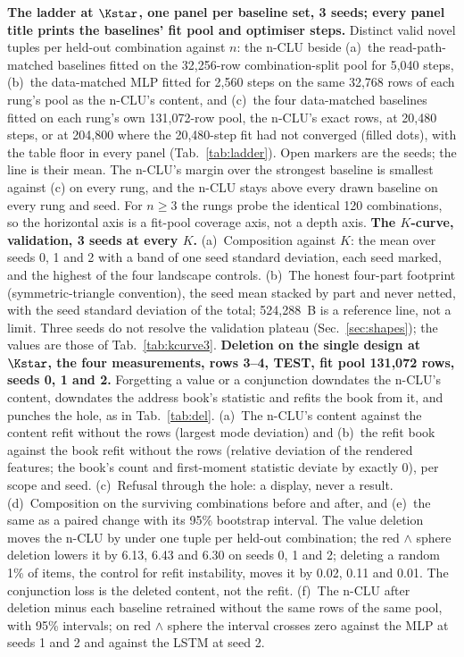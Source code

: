 \textbf{The ladder at $\Kstar$, one panel per baseline set, 3 seeds; every panel title prints the baselines' fit pool and optimiser steps.} Distinct valid novel tuples per held-out combination against $n$: the n-CLU beside (a)~the read-path-matched baselines fitted on the 32,256-row combination-split pool for 5,040 steps, (b)~the data-matched MLP fitted for 2,560 steps on the same 32,768 rows of each rung's pool as the n-CLU's content, and (c)~the four data-matched baselines fitted on each rung's own 131,072-row pool, the n-CLU's exact rows, at 20,480 steps, or at 204,800 where the 20,480-step fit had not converged (filled dots), with the table floor in every panel (Tab.~\ref{tab:ladder}). Open markers are the seeds; the line is their mean. The n-CLU's margin over the strongest baseline is smallest against (c) on every rung, and the n-CLU stays above every drawn baseline on every rung and seed. For $n\ge3$ the rungs probe the identical 120 combinations, so the horizontal axis is a fit-pool coverage axis, not a depth axis.
\textbf{The $K$-curve, validation, 3 seeds at every $K$.} (a)~Composition against $K$: the mean over seeds 0, 1 and 2 with a band of one seed standard deviation, each seed marked, and the highest of the four landscape controls. (b)~The honest four-part footprint (symmetric-triangle convention), the seed mean stacked by part and never netted, with the seed standard deviation of the total; 524,288~B is a reference line, not a limit. Three seeds do not resolve the validation plateau (Sec.~\ref{sec:shapes}); the values are those of Tab.~\ref{tab:kcurve3}.
\textbf{Deletion on the single design at $\Kstar$, the four measurements, rows 3--4, TEST, fit pool 131,072 rows, seeds 0, 1 and 2.} Forgetting a value or a conjunction downdates the n-CLU's content, downdates the address book's statistic and refits the book from it, and punches the hole, as in Tab.~\ref{tab:del}. (a)~The n-CLU's content against the content refit without the rows (largest mode deviation) and (b)~the refit book against the book refit without the rows (relative deviation of the rendered features; the book's count and first-moment statistic deviate by exactly 0), per scope and seed. (c)~Refusal through the hole: a display, never a result. (d)~Composition on the surviving combinations before and after, and (e)~the same as a paired change with its 95\% bootstrap interval. The value deletion moves the n-CLU by under one tuple per held-out combination; the red $\wedge$ sphere deletion lowers it by 6.13, 6.43 and 6.30 on seeds 0, 1 and 2; deleting a random 1\% of items, the control for refit instability, moves it by 0.02, 0.11 and 0.01. The conjunction loss is the deleted content, not the refit. (f)~The n-CLU after deletion minus each baseline retrained without the same rows of the same pool, with 95\% intervals; on red $\wedge$ sphere the interval crosses zero against the MLP at seeds 1 and 2 and against the LSTM at seed 2.
